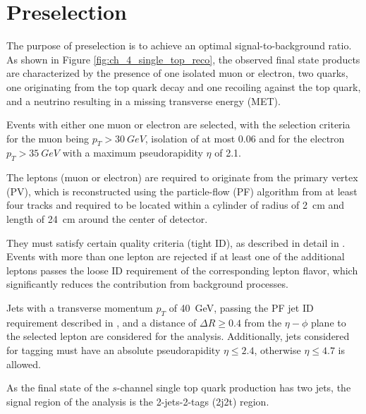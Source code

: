 \section{Preselection}
\label{sec:ch-4-preselection}
The purpose of preselection is to achieve an optimal signal-to-background ratio. As shown in Figure \ref{fig:ch_4_single_top_reco}, the observed final state products are characterized by the presence of one isolated muon or electron, two \Pbottom quarks, one originating from the top quark decay and one recoiling against the top quark, and a neutrino resulting in a missing transverse energy (MET).

Events with either one muon or electron are selected, with the selection criteria for the muon being $p_T > \SI{30}{GeV}$, isolation of at most 0.06 and for the electron $p_T > \SI{35}{GeV}$ with a maximum pseudorapidity $\eta$ of 2.1.

The leptons (muon or electron) are required to originate from the primary vertex (PV), which is reconstructed using the particle-flow (PF) algorithm from at least four tracks and required to be located within a cylinder of radius of \SI{2}{cm} and length of \SI{24}{cm} around the center of detector. 

They must satisfy certain quality criteria (tight ID), as described in detail in \cite{Fal18}. Events with more than one lepton are rejected if at least one of the additional leptons passes the loose ID requirement of the corresponding lepton flavor, which significantly reduces the contribution from background processes.

Jets with a transverse momentum $p_T$ of \SI{40}{GeV}, passing the PF jet ID requirement described in \cite{Fal18}, and a distance of $\Delta R \geq 0.4$ from the $\eta-\phi$ plane to the selected lepton are considered for the analysis. Additionally, jets considered for \Pbottom tagging must have an absolute pseudorapidity $\eta \leq 2.4$, otherwise $\eta \leq 4.7$ is allowed.

As the final state of the $s$-channel single top quark production has two jets, the signal region of the analysis is the 2-jets-2-tags (2j2t) region.

